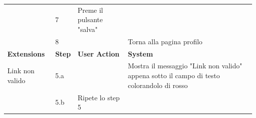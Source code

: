 \begin{table}[H]
\begin{tabularx}{\linewidth}{|p{135pt}|p{25pt}|>{\raggedright\arraybackslash}X|>{\raggedright\arraybackslash}X|}
		\cline{2-4}                                        & 7                                                                                                                                                                          & Preme il pulsante "salva"                        &                                                                                           \\
		\cline{2-4}                                        & 8                                                                                                                                                                          &                                                  & Torna alla pagina profilo                                                                 \\

		\hline \rowcolor[HTML]{DCDCDC}
		\textbf{\sffamily Extensions}                      & \textbf{\sffamily Step}                                                                                                                                                    & \textbf{\sffamily User Action}                   & \textbf{\sffamily System}                                                                 \\
		\hline
		\multirow{1}{135pt}{Link non valido}               & 5.a                                                                                                                                                                        &                                                  & Mostra il messaggio "Link non valido" appena sotto il campo di testo colorandolo di rosso \\
		\cline{2-4}                                        & 5.b                                                                                                                                                                        & Ripete lo step 5                                 &                                                                                           \\

		\hline
	\end{tabularx}
\end{table}

\newpage
